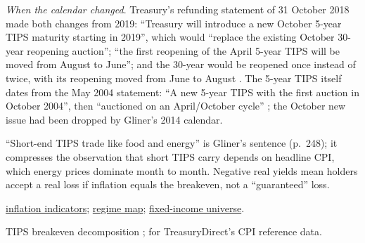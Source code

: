 \begin{qfdefinition}
\emph{When the calendar changed}. Treasury's refunding statement of 31 October 2018 made both changes from 2019: ``Treasury will introduce a new October 5-year TIPS maturity starting in 2019'', which would ``replace the existing October 30-year reopening auction''; ``the first reopening of the April 5-year TIPS will be moved from August to June''; and the 30-year would be reopened once instead of twice, with its reopening moved from June to August \citep[statement and its 2018--2019 auction table]{treasury-refunding-2018-10}. The 5-year TIPS itself dates from the May 2004 statement: ``A new 5-year TIPS with the first auction in October 2004'', then ``auctioned on an April/October cycle'' \citep[statement of 5 May 2004]{treasury-refunding-2004-05}; the October new issue had been dropped by Gliner's 2014 calendar.

``Short-end TIPS trade like food and energy'' is Gliner's sentence (p.~248); it compresses the observation that short TIPS carry depends on headline CPI, which energy prices dominate month to month. Negative real yields mean holders accept a real loss if inflation equals the breakeven, not a ``guaranteed'' loss.

 \hyperref[def:macroeconomic-indicators]{inflation indicators}; \hyperref[def:macro-regime-asset-map]{regime map}; \hyperref[def:fixed-income-universe]{fixed-income universe}.

 TIPS breakeven decomposition \citep{gap-inflation-tips-decomposition}; \citep{gap-inflation-tips-spec} for TreasuryDirect's CPI reference data.

\end{qfdefinition}
